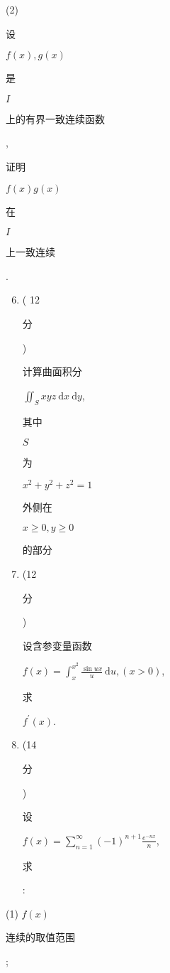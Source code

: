 \documentclass[10pt]{article}
\begin{document}
(2) \begin{CJK}{UTF8}{mj}设\end{CJK} $f(x), g(x)$ \begin{CJK}{UTF8}{mj}是\end{CJK} $I$ \begin{CJK}{UTF8}{mj}上的有界一致连续函数\end{CJK}, \begin{CJK}{UTF8}{mj}证明\end{CJK} $f(x) g(x)$ \begin{CJK}{UTF8}{mj}在\end{CJK} $I$ \begin{CJK}{UTF8}{mj}上一致连续\end{CJK}.

\begin{enumerate}
  \setcounter{enumi}{5}
  \item ( 12 \begin{CJK}{UTF8}{mj}分\end{CJK}) \begin{CJK}{UTF8}{mj}计算曲面积分\end{CJK} $\iint_{S} x y z \mathrm{~d} x \mathrm{~d} y$, \begin{CJK}{UTF8}{mj}其中\end{CJK} $S$ \begin{CJK}{UTF8}{mj}为\end{CJK} $x^{2}+y^{2}+z^{2}=1$ \begin{CJK}{UTF8}{mj}外侧在\end{CJK} $x \geqslant 0, y \geqslant 0$ \begin{CJK}{UTF8}{mj}的部分\end{CJK}

  \item (12 \begin{CJK}{UTF8}{mj}分\end{CJK}) \begin{CJK}{UTF8}{mj}设含参变量函数\end{CJK} $f(x)=\int_{x}^{x^{2}} \frac{\sin u x}{u} \mathrm{~d} u,(x>0)$, \begin{CJK}{UTF8}{mj}求\end{CJK} $f^{\prime}(x)$.

  \item (14 \begin{CJK}{UTF8}{mj}分\end{CJK}) \begin{CJK}{UTF8}{mj}设\end{CJK} $f(x)=\sum_{n=1}^{\infty}(-1)^{n+1} \frac{e^{-n x}}{n}$, \begin{CJK}{UTF8}{mj}求\end{CJK}:

\end{enumerate}
(1) $f(x)$ \begin{CJK}{UTF8}{mj}连续的取值范围\end{CJK};
\end{document}
